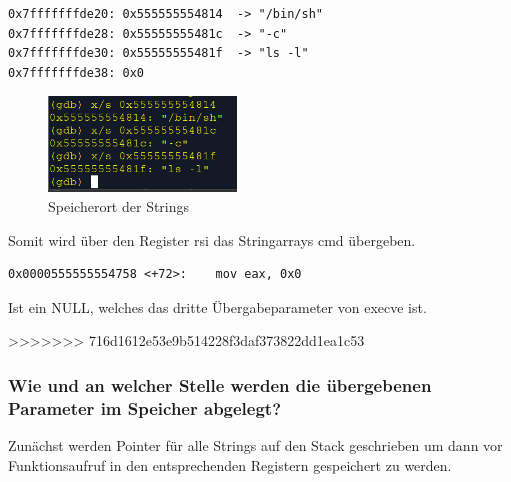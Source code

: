 \documentclass[12pt]{article}
\begin{document}
\begin{lstlisting}
0x7fffffffde20: 0x555555554814  -> "/bin/sh"
0x7fffffffde28: 0x55555555481c	-> "-c"
0x7fffffffde30: 0x55555555481f	-> "ls -l"
0x7fffffffde38: 0x0
\end{lstlisting}
\begin{figure}[h!]
	\includegraphics[width=5cm]{../images/Bufferoverflow_Aufgabe1a_Pointeruebergabeparams.jpg}
	\caption{Speicherort der Strings}
\end{figure}
Somit wird über den Register rsi das Stringarrays cmd übergeben.

\newpage
\begin{lstlisting}
0x0000555555554758 <+72>:    mov eax, 0x0 
\end{lstlisting}
Ist ein NULL, welches das dritte Übergabeparameter von execve ist.


>>>>>>> 716d1612e53e9b514228f3daf373822dd1ea1c53


\subsubsection{Wie und an welcher Stelle werden die übergebenen Parameter im Speicher abgelegt?}

Zunächst werden Pointer für alle Strings auf den Stack geschrieben um dann vor Funktionsaufruf in den entsprechenden Registern gespeichert zu werden.
\end{document}

